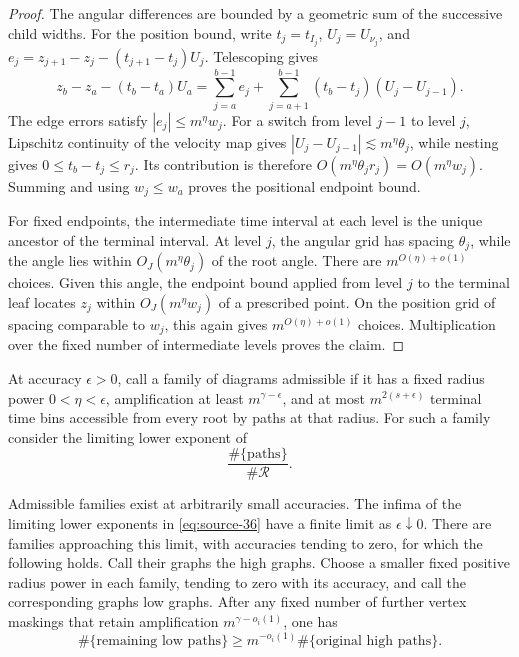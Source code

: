 \begin{proof}
The angular differences are bounded by a geometric sum of the
successive child widths. For the position bound, write
\(t_j=t_{I_j}\), \(U_j=U_{\nu_j}\), and
\(e_j=z_{j+1}-z_j-(t_{j+1}-t_j)U_j\). Telescoping gives
\[
 z_b-z_a-(t_b-t_a)U_a
 =\sum_{j=a}^{b-1}e_j+
   \sum_{j=a+1}^{b-1}(t_b-t_j)(U_j-U_{j-1}).
\]
The edge errors satisfy \(|e_j|\leq m^\eta w_j\).
For a switch from level \(j-1\) to level \(j\), Lipschitz
continuity of the velocity map gives
\(|U_j-U_{j-1}|\lesssim m^\eta\theta_j\), while nesting gives
\(0\leq t_b-t_j\leq r_j\). Its contribution is therefore
\(O(m^\eta\theta_jr_j)=O(m^\eta w_j)\).
Summing and using \(w_j\leq w_a\) proves the positional endpoint bound.

For fixed endpoints, the intermediate time interval at each level is
the unique ancestor of the terminal interval. At level \(j\), the
angular grid has spacing \(\theta_j\), while the angle lies within
\(O_J(m^\eta\theta_j)\) of the root angle. There are
\(m^{O(\eta)+o(1)}\) choices. Given this angle, the endpoint bound
applied from level \(j\) to the terminal leaf locates \(z_j\) within
\(O_J(m^\eta w_j)\) of a prescribed point. On the position grid of
spacing comparable to \(w_j\), this again gives
\(m^{O(\eta)+o(1)}\) choices. Multiplication over the fixed number
of intermediate levels proves the claim.
\end{proof}

At accuracy \(\epsilon>0\), call a family of diagrams admissible if it
has a fixed radius power \(0<\eta<\epsilon\), amplification at least
\(m^{\gamma-\epsilon}\), and at most \(m^{2(s+\epsilon)}\) terminal
time bins accessible from every root by paths at that radius.
For such a family consider the limiting lower exponent of
\begin{equation}\label{eq:source-36}
                 \frac{\#\{\text{paths}\}}{\#\mathcal R}.
\end{equation}

\begin{lemma}\label{ext:path-minimum}
Admissible families exist at arbitrarily small accuracies. The infima
of the limiting lower exponents in \eqref{eq:source-36} have a finite
limit as \(\epsilon\downarrow0\). There are families approaching this
limit, with accuracies tending to zero, for which the following holds.
Call their graphs the high graphs. Choose a smaller fixed positive
radius power in each family, tending to zero with its accuracy, and
call the corresponding graphs low graphs. After any fixed number of
further vertex maskings that retain amplification
\(m^{\gamma-o_i(1)}\), one has
\begin{equation}\label{eq:source-37}
 \#\{\text{remaining low paths}\}
       \geq m^{-o_i(1)}\#\{\text{original high paths}\}.
\end{equation}
\end{lemma}

